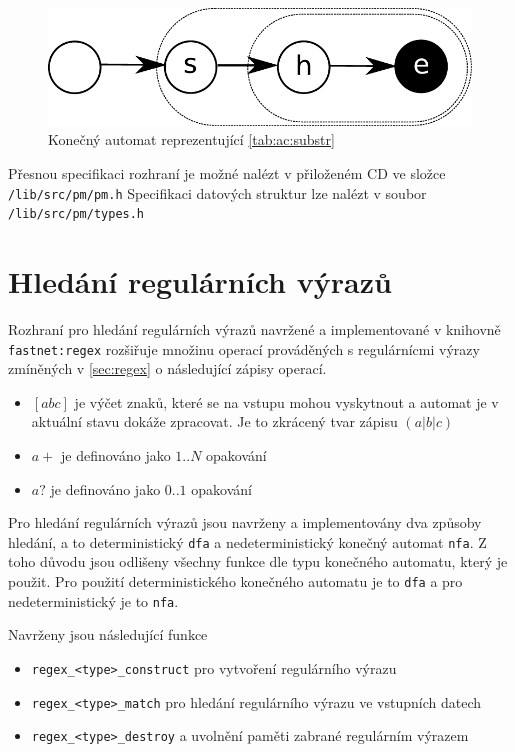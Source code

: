 \begin{figure}[!htbp]
    \centering
    \includegraphics[scale=0.7]{fig/ac-substr.pdf}
    \caption{Konečný automat reprezentující \ref{tab:ac:substr}}
    \label{fig:ac:substr}
\end{figure}


Přesnou specifikaci rozhraní je možné nalézt v přiloženém CD ve složce \texttt{/lib/src/pm/pm.h}
Specifikaci datových struktur lze nalézt v soubor \texttt{/lib/src/pm/types.h}

\section{Hledání regulárních výrazů}\label{api:regex}  %

Rozhraní pro hledání regulárních výrazů navržené a implementované v knihovně \texttt{fastnet:regex}
rozšiřuje množinu operací prováděných s regulárnícmi výrazy zmíněných v \ref{sec:regex} o následující zápisy operací.

\begin{itemize}
    \item{$[abc]$ je výčet znaků, které se na vstupu mohou vyskytnout a automat je v aktuální stavu dokáže zpracovat. Je to zkrácený tvar zápisu $(a|b|c)$}
    \item{$a+$ je definováno jako $1..N$ opakování}
    \item{$a?$ je definováno jako $0..1$ opakování}
\end{itemize}


Pro hledání regulárních výrazů jsou navrženy a implementovány dva způsoby hledání, a to
deterministický \texttt{dfa} a nedeterministický konečný automat \texttt{nfa}.
Z toho důvodu jsou odlišeny všechny funkce dle typu konečného automatu, který je použit.
Pro použití deterministického konečného automatu je to \texttt{dfa} a pro nedeterministický
je to \texttt{nfa}.

Navrženy jsou následující funkce

\begin{itemize}
    \item{\texttt{regex\_<type>\_construct} pro vytvoření regulárního výrazu}
    \item{\texttt{regex\_<type>\_match} pro hledání regulárního výrazu ve vstupních datech}
    \item{\texttt{regex\_<type>\_destroy} a uvolnění paměti zabrané regulárním výrazem}
\end{itemize}

